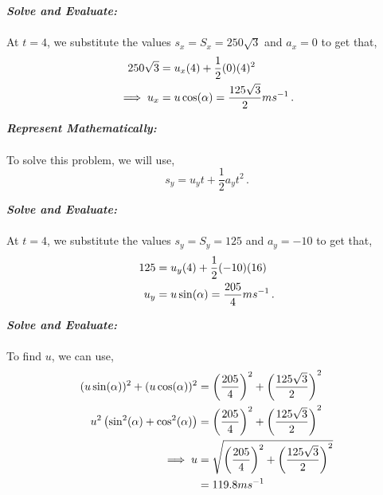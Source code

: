 \begin{subquestions}
\begin{subsubquestions}
\textbf{\textit{Solve and Evaluate:}} \\ \\
At $t=4$, we substitute the values $s_x=S_x=250\sqrt{3}$ and $a_x=0$ to get that,
\begin{align}
	250\sqrt{3} & = u_x(4) + \frac{1}{2}(0)(4)^2 \nonumber \\
	\implies u_x & = u\cos(\alpha) = \frac{125\sqrt{3}}{2}ms^{-1} \,.
\end{align} 


\subsubquestion

\textbf{\textit{Represent Mathematically:}} \\ \\
To solve this problem, we will use,
\begin{equation}
	s_y = u_yt + \frac{1}{2}a_yt^2 \,.
\end{equation}




\textbf{\textit{Solve and Evaluate:}} \\ \\
At $t=4$, we substitute the values $s_y=S_y=125$ and $a_y=-10$ to get that,
\begin{align}
	125 & = u_y(4) + \frac{1}{2}(-10)(16) \nonumber \\
	u_y & = u\sin(\alpha) = \frac{205}{4}ms^{-1} \,.
\end{align}


\subsubquestion

\textbf{\textit{Solve and Evaluate:}} \\ \\
To find $u$, we can use,
\begin{align}
	(u\sin(\alpha))^2 + (u\cos(\alpha))^2 & = \left(\frac{205}{4}\right)^2 + \left(\frac{125\sqrt{3}}{2}\right)^2 \nonumber \\
	 u^2\left(\sin^2(\alpha)+\cos^2(\alpha)\right) & = \left(\frac{205}{4}\right)^2 + \left(\frac{125\sqrt{3}}{2}\right)^2 \nonumber \\
	 \implies u & = \sqrt{\left(\frac{205}{4}\right)^2 + \left(\frac{125\sqrt{3}}{2}\right)^2} \nonumber \\
	            & = 119.8ms^{-1}
\end{align}



\end{subsubquestions}
\end{subquestions}
